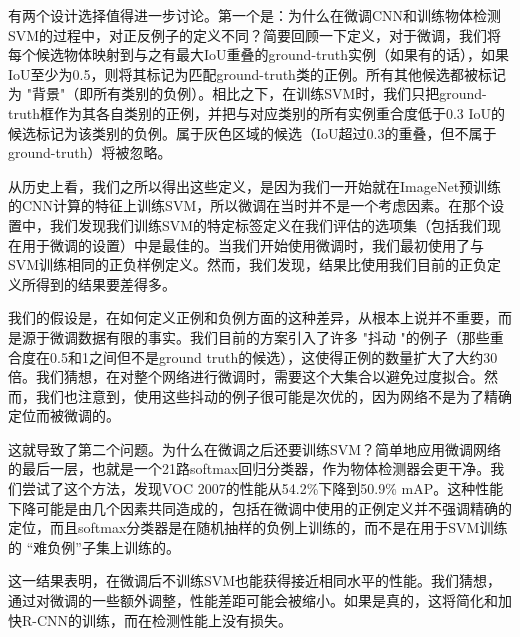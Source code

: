 \documentclass[../main.tex]{subfile}
\begin{document}
有两个设计选择值得进一步讨论。第一个是：为什么在微调CNN和训练物体检测SVM的过程中，对正反例子的定义不同？简要回顾一下定义，对于微调，我们将每个候选物体映射到与之有最大IoU重叠的ground-truth实例（如果有的话），如果IoU至少为0.5，则将其标记为匹配ground-truth类的正例。所有其他候选都被标记为 "背景"（即所有类别的负例）。相比之下，在训练SVM时，我们只把ground-truth框作为其各自类别的正例，并把与对应类别的所有实例重合度低于0.3 IoU的候选标记为该类别的负例。属于灰色区域的候选（IoU超过0.3的重叠，但不属于ground-truth）将被忽略。

从历史上看，我们之所以得出这些定义，是因为我们一开始就在ImageNet预训练的CNN计算的特征上训练SVM，所以微调在当时并不是一个考虑因素。在那个设置中，我们发现我们训练SVM的特定标签定义在我们评估的选项集（包括我们现在用于微调的设置）中是最佳的。当我们开始使用微调时，我们最初使用了与SVM训练相同的正负样例定义。然而，我们发现，结果比使用我们目前的正负定义所得到的结果要差得多。

我们的假设是，在如何定义正例和负例方面的这种差异，从根本上说并不重要，而是源于微调数据有限的事实。我们目前的方案引入了许多 "抖动 "的例子（那些重合度在0.5和1之间但不是ground truth的候选），这使得正例的数量扩大了大约30倍。我们猜想，在对整个网络进行微调时，需要这个大集合以避免过度拟合。然而，我们也注意到，使用这些抖动的例子很可能是次优的，因为网络不是为了精确定位而被微调的。

这就导致了第二个问题。为什么在微调之后还要训练SVM？简单地应用微调网络的最后一层，也就是一个21路softmax回归分类器，作为物体检测器会更干净。我们尝试了这个方法，发现VOC 2007的性能从54.2\%下降到50.9\% mAP。这种性能下降可能是由几个因素共同造成的，包括在微调中使用的正例定义并不强调精确的定位，而且softmax分类器是在随机抽样的负例上训练的，而不是在用于SVM训练的 “难负例”子集上训练的。

这一结果表明，在微调后不训练SVM也能获得接近相同水平的性能。我们猜想，通过对微调的一些额外调整，性能差距可能会被缩小。如果是真的，这将简化和加快R-CNN的训练，而在检测性能上没有损失。
\end{document}
